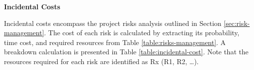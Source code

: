\vspace{-10pt}

\textbf{Incidental Costs}
\vspace{-5pt}

Incidental costs encompass the project risks analysis outlined in Section \ref{sec:risk-management}. The cost of each risk is calculated by extracting its probability, time cost, and required resources from Table \ref{table:risks-management}. A breakdown calculation is presented in Table \ref{table:incidental-cost}. Note that the resources required for each risk are identified as Rx (R1, R2, …).

\vspace{-10pt}

\begin{table}[H]
    \renewcommand{\arraystretch}{1.2} 
    \centering
    \footnotesize
    \setlength{\tabcolsep}{3.5pt} 
    \normalsize 
    \caption[Incidental cost.]
    {Incidental cost. [Own creation]} 
    \vspace{-1em}
    \label{table:incidental-cost}
\end{table}

\vspace{-10pt}



